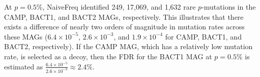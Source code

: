 At $p=0.5$\%, NaiveFreq identified 249, 17,069, and 1,632 rare $p$-mutations in the CAMP, BACT1, and BACT2 MAGs, respectively. This illustrates that there exists a difference of nearly two orders of magnitude in mutation rates across these MAGs ($6.4 \times 10^{-5}$, $2.6 \times 10^{-3}$, and $1.9 \times 10^{-4}$ for CAMP, BACT1, and BACT2, respectively). If the CAMP MAG, which has a relatively low mutation rate, is selected as a decoy, then the FDR for the BACT1 MAG at $p=0.5\%$ is estimated as $\frac{6.4 \times 10^{-5}}{2.6 \times 10^{-3}} \approx 2.4\%$.\endinput